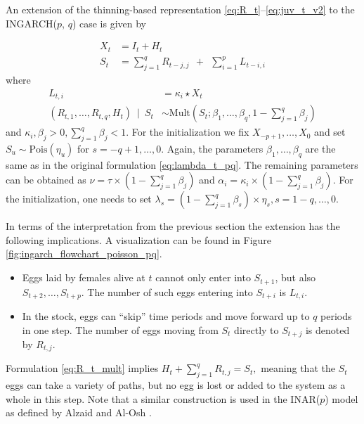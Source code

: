 \documentclass[review]{elsarticle}
\begin{document}
An extension of the thinning-based representation \eqref{eq:R_t}--\eqref{eq:juv_t_v2} to the INGARCH($p$, $q$) case is given by

\begin{align}
X_t & = I_t + H_t \label{eq:Xt_thinning_pq}\\
S_t & = \sum_{j = 1}^q R_{t - j, j} \ \ + \ \ \sum_{i = 1}^p L_{t - i, i}
\end{align}
where
\begin{align}
L_{t, i} & = \kappa_i \star X_t\\
(R_{t, 1}, \dots, R_{t, q}, H_t) \ \mid \ S_t & \sim \text{Mult}\left(S_t; \beta_1, \dots, \beta_q, 1 - \sum_{j = 1}^q \beta_j\right)\label{eq:R_t_mult}
\end{align}
and $\kappa_i, \beta_j > 0, \sum_{j = 1}^q \beta_j < 1$. For the initialization we fix $X_{-p + 1}, \dots, X_0$ and set $S_{u} \sim \text{Pois}(\eta_u)$ for $s = -q + 1, \dots, 0$. Again, the parameters $\beta_{1}, \dots, \beta_q$ are the same as in the original formulation \eqref{eq:lambda_t_pq}. The remaining parameters can be obtained as $\nu = \tau \times \left(1 - \sum_{j = 1}^q\beta_j \right)$ and $\alpha_i = \kappa_i \times \left(1 - \sum_{j = 1}^q\beta_j \right)$. For the initialization, one needs to set $\lambda_s = (1 - \sum_{j = 1}^q\beta_s) \times \eta_s, s = 1 - q, \dots, 0$.

In terms of the interpretation from the previous section the extension has the following implications. A visualization can be found in Figure \ref{fig:ingarch_flowchart_poisson_pq}.
\begin{itemize}
\item Eggs laid by females alive at $t$ cannot only enter into $S_{t + 1}$, but also $S_{t + 2}, \dots, S_{t + p}$. The number of such eggs entering into $S_{t + i}$ is $L_{t, i}$.
\item In the stock, eggs can ``skip'' time periods and move forward up to $q$ periods in one step. The number of eggs moving from $S_t$ directly to $S_{t + j}$ is denoted by $R_{t, j}$.
\end{itemize}
Formulation \eqref{eq:R_t_mult} implies $H_t + \sum_{j = 1}^q R_{t, j} = S_t,$ meaning that the $S_t$ eggs can take a variety of paths, but no egg is lost or added to the system as a whole in this step. Note that a similar construction is used in the INAR($p$) model as defined by Alzaid and Al-Osh \cite{Alzaid1990}.
\end{document}
